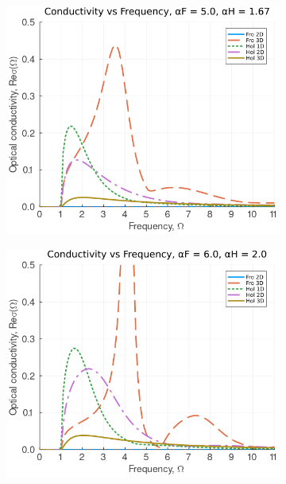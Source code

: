 \begin{figure}[!tbp]
\begin{subfigure}[b]{0.49\textwidth}
    \centering
    \includegraphics[width=\textwidth]{figures/re_con_freq_5_167.png}
  \end{subfigure}
  \hfill
  \begin{subfigure}[b]{0.49\textwidth}
    \centering
    \includegraphics[width=\textwidth]{figures/re_con_freq_6_2.png}
  \end{subfigure}
  \begin{subfigure}[b]{0.49\textwidth}
    \centering

\end{subfigure}
\end{figure}
